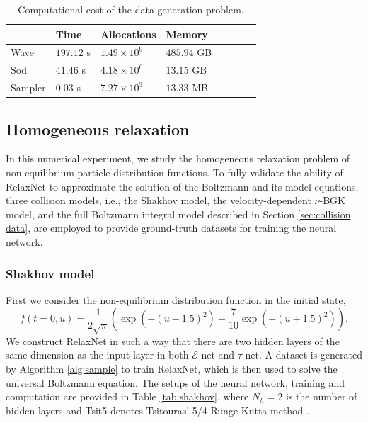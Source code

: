 \documentclass[preprint,3p,12pt,sort&compress]{elsarticle}
\begin{document}
\begin{table}[htbp]
	\caption{Computational cost of the data generation problem.} 
	\centering
	\begin{tabular}{llllllll} 
		\hline
		 & Time & Allocations & Memory & \\
		\hline
		Wave & $197.12$ s & $1.49\times 10^9$ & $485.94$ GB & \\
		Sod & $41.46$ s & $4.18\times 10^6$ & $13.15$ GB & \\ 
		Sampler & $0.03$ s & $7.27\times 10^3$ & $13.33$ MB & \\
		\hline
	\end{tabular} 
	\label{tab:cost1}
\end{table}

\subsection{Homogeneous relaxation}

In this numerical experiment, we study the homogeneous relaxation problem of non-equilibrium particle distribution functions.
To fully validate the ability of RelaxNet to approximate the solution of the Boltzmann and its model equations, three collision models, i.e., the Shakhov model, the velocity-dependent $\nu$-BGK model, and the full Boltzmann integral model described in Section \ref{sec:collision data}, are employed to provide ground-truth datasets for training the neural network.

\subsubsection{Shakhov model}\label{sec:relaxation shakhov}

First we consider the non-equilibrium distribution function in the initial state,
\begin{equation}
    f(t=0,u) = \frac{1}{2\sqrt{\pi}} \left( \exp\left(-\left(u-1.5\right)^2\right) + \frac{7}{10}\exp\left(-(u+1.5)^2 \right) \right).
    \label{eqn:f0 1d}
\end{equation}
We construct RelaxNet in such a way that there are two hidden layers of the same dimension as the input layer in both
$\mathcal E$-net and $\tau$-net.
A dataset is generated by Algorithm \ref{alg:sample} to train RelaxNet, which is then used to solve the universal Boltzmann equation.
The setups of the neural network, training and computation are provided in Table \ref{tab:shakhov}, where $N_h=2$ is the number of hidden layers and Tsit5 denotes Tsitouras’ 5/4 Runge-Kutta method \cite{tsitouras2011modified}.
\end{document}
